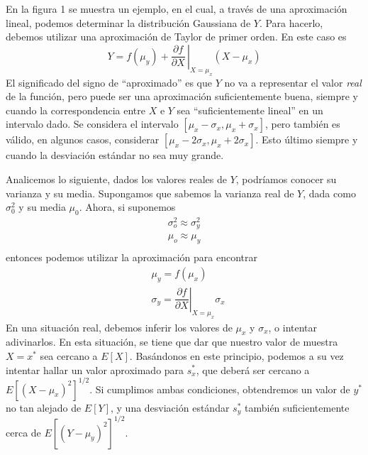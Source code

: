 \documentclass[a4paper, 10pt]{article}
\begin{document}
En la figura 1 se muestra un ejemplo, en el cual, a través de una aproximación
lineal, podemos determinar la distribución Gaussiana de $Y$. Para hacerlo, debemos
utilizar una aproximación de Taylor de primer orden. En este caso es
\begin{equation}
    Y = f(\mu_y) + \left. \dfrac{\partial f}{\partial X}\,\right\rvert_{X=\mu_x} \left(X-\mu_x\right)
\end{equation}
El significado del signo de ``aproximado'' es que $Y$ no va a representar el valor
\textit{real} de la función, pero puede ser una aproximación suficientemente buena, siempre
y cuando la correspondencia entre $X$ e $Y$ sea ``suficientemente lineal'' en un intervalo dado.
Se considera el intervalo $[\mu_x - \sigma_x, \mu_x + \sigma_x]$, pero también es válido,
en algunos casos, considerar $[\mu_x - 2\sigma_x, \mu_x + 2\sigma_x]$. Esto último siempre y cuando
la desviación estándar no sea muy grande.

Analicemos lo siguiente, dados los valores reales de $Y$, podríamos conocer su varianza y su media.
Supongamos que sabemos la varianza real de $Y$, dada como $\sigma^{2}_0$ y su media $\mu_0$. Ahora,
si suponemos
\begin{equation}
    \begin{split}
        \sigma^{2}_o \approx \sigma^{2}_y \\
        \mu_o \approx \mu_y \\
    \end{split}
\end{equation}
entonces podemos utilizar la aproximación para encontrar
\begin{equation}
    \begin{split}
        &\mu_y = f(\mu_x)\\
        &\sigma_y = \left.\dfrac{\partial f}{\partial X}\right\rvert_{X=\mu_x} \sigma_x
    \end{split}
\end{equation}
En una situación real, debemos inferir los valores de $\mu_x$ y $\sigma_x$, o intentar
adivinarlos. En esta situación, se tiene que dar que nuestro valor de muestra $X = x^{*}$ sea cercano
a $E[X]$. Basándonos en este principio, podemos a su vez intentar hallar un valor aproximado para
$s_x^{*}$, que deberá ser cercano a $E\left[(X-\mu_x)^{2}\right]^{1/2}$. Si cumplimos ambas condiciones,
obtendremos un valor de $y^{*}$ no tan alejado de $E[Y]$, y una desviación estándar $s_y^{*}$ también
suficientemente cerca de $E\left[(Y-\mu_y)^{2}\right]^{1/2}$.
\end{document}
